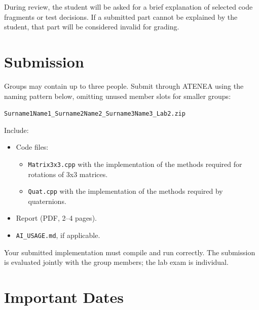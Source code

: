\documentclass[11pt,a4paper]{article}
\begin{document}
During review, the student will be asked for a brief explanation of selected code fragments or test decisions. If a submitted part cannot be explained by the
student, that part will be considered invalid for grading.

\section*{Submission}

Groups may contain up to three people. Submit through ATENEA using the naming
pattern below, omitting unused member slots for smaller groups:
\begin{center}
\small\texttt{Surname1Name1\_Surname2Name2\_Surname3Name3\_Lab2.zip}
\end{center}

Include:
\begin{itemize}[leftmargin=*]
    \item Code files:
    \begin{itemize}[leftmargin=*]
        \item \texttt{Matrix3x3.cpp} with the implementation of the methods required for rotations of 3x3 matrices.
        \item \texttt{Quat.cpp} with the implementation of the methods required by quaternions.
    \end{itemize}
    \item Report (PDF, 2--4 pages).
    \item \texttt{AI\_USAGE.md}, if applicable.
\end{itemize}

Your submitted implementation must compile and run correctly.
The submission is evaluated jointly with the group members; the lab exam is
individual.

\section*{Important Dates}
\noindent{}
\end{document}
